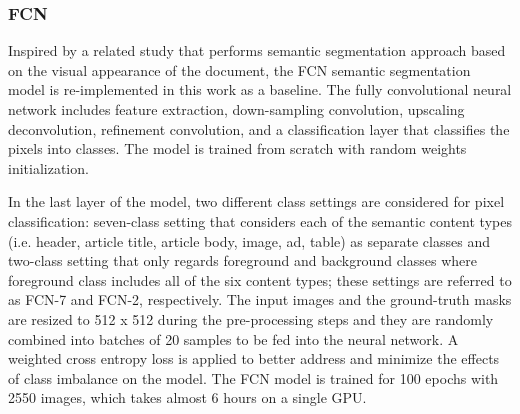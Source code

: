 \documentclass[letterpaper]{article} %
\begin{document}
\subsubsection{FCN}
Inspired by a related study \cite{DBLP:conf/icdar/MeierSSAC17} that performs semantic segmentation approach based on the visual appearance of the document, the FCN semantic segmentation model is re-implemented in this work as a baseline. The fully convolutional neural network includes feature extraction, down-sampling convolution, upscaling deconvolution, refinement convolution, and a classification layer that classifies the pixels into classes. The model is trained from scratch with random weights initialization.

In the last layer of the model, two different class settings are considered for pixel classification: seven-class setting that considers each of the semantic content types (i.e. header, article title, article body, image, ad, table) as separate classes and two-class setting that only regards foreground and background classes where foreground class includes all of the six content types; these settings are referred to as FCN-7 and FCN-2, respectively. 
The input images and the ground-truth masks are resized to 512 x 512 during the pre-processing steps
and they are randomly combined into batches of 20 samples to be fed into the neural network. A weighted cross entropy loss is applied to better address and minimize the effects of class imbalance on the model. The FCN model is trained for 100 epochs with 2550 images, which takes almost 6 hours on a single GPU.
\end{document}
